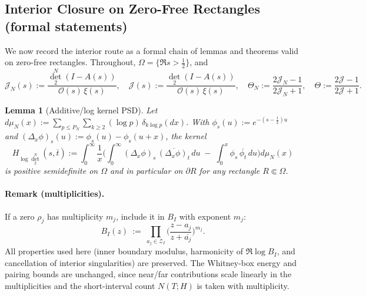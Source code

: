 \documentclass[11pt]{article}
\newtheorem{lemma}[theorem]{Lemma}
\theoremstyle{definition}
\theoremstyle{remark}
\begin{document}
\subsection*{Interior Closure on Zero-Free Rectangles (formal statements)}
We now record the interior route as a formal chain of lemmas and theorems valid on zero-free rectangles. Throughout, \(\Omega=\{\Re s>\tfrac12\}\), and
\[\mathcal J_N(s):=\frac{\det_2^N(I-A(s))}{\mathcal O(s)\,\xi(s)},\quad \mathcal J(s):=\frac{\det_2(I-A(s))}{\mathcal O(s)\,\xi(s)},\quad \Theta_N:=\frac{2\mathcal J_N-1}{2\mathcal J_N+1},\quad \Theta:=\frac{2\mathcal J-1}{2\mathcal J+1}.
\]

\begin{lemma}[Additive/log kernel PSD]\label{lem:log-psd-formal}
Let \(d\mu_N(x):=\sum_{p\le P_N}\sum_{k\ge2}(\log p)\,\delta_{k\log p}(dx)\). With \(\phi_s(u):=e^{-(s-\frac12)u}\) and \((\Delta_x\phi)_s(u):=\phi_s(u)-\phi_s(u+x)\), the kernel
\[H_{\log\det_2^N}(s,\overline t):=\int_0^\infty \frac{1}{x}\Big(\int_0^\infty (\Delta_x\phi)_s\,\overline{(\Delta_x\phi)_t}\,du\; -\; \int_0^x \phi_s\,\overline{\phi_t}\,du\Big)d\mu_N(x)
\]
is positive semidefinite on \(\Omega\) and in particular on \(\partial R\) for any rectangle \(R\Subset\Omega\).
\end{lemma}

\paragraph{Remark (multiplicities).}
If a zero $\rho_j$ has multiplicity $m_j$, include it in $B_I$ with exponent $m_j$:
\[
 B_I(z)\ :=\ \prod_{a_j\in\mathcal Z_I}\Big(\frac{z-a_j}{z+\overline{a_j}}\Big)^{m_j}.
\]
All properties used here (inner boundary modulus, harmonicity of $\Re\log B_I$, and cancellation of interior singularities) are preserved. The Whitney-box energy and pairing bounds are unchanged, since near/far contributions scale linearly in the multiplicities and the short-interval count $N(T;H)$ is taken with multiplicity.

\fi %
\end{document}
